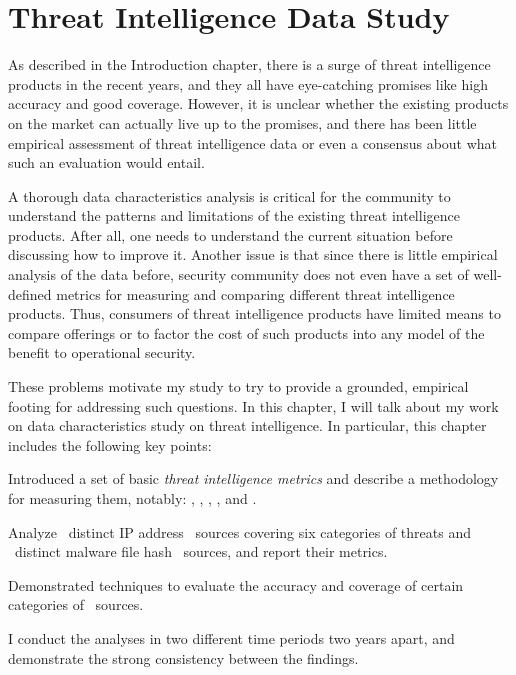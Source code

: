 \chapter{Threat Intelligence Data Study}
\label{chapter:data_character}

As described in the Introduction 
chapter, there is a surge of threat intelligence products in the 
recent years, and they all have eye-catching promises like high 
accuracy and good coverage. However, it is unclear whether the
existing products on the market can actually live up to the 
promises, and there has been little empirical assessment of 
threat intelligence data or even a consensus about what such an
evaluation would entail. 

A thorough data characteristics analysis is critical for the 
community to understand the patterns and limitations of the
existing threat intelligence products. After all, one needs to 
understand the current situation before discussing how to 
improve it. Another issue is that since there is little empirical 
analysis of the data before, security community does not even 
have a set of well-defined metrics for
measuring and comparing different threat intelligence products. 
Thus, consumers of threat intelligence products have limited means 
to compare offerings or to factor the cost of such products into 
any model of the benefit to operational security.

These problems motivate my study to try to provide a grounded,
empirical footing for addressing such questions. 
In this chapter, I will talk about my work on data characteristics
study on threat intelligence. In particular, this chapter includes 
the following key points:
\begin{prettylist}
\item Introduced a set of basic \emph{threat intelligence metrics}
and describe a methodology for measuring them, notably: 
,
, ,
,  and .
\item Analyze \numipfeeds\ distinct IP address \ti\ sources covering
six categories of threats and \numhashfeeds\ distinct malware file hash
\ti\ sources, and report their metrics.
\item Demonstrated techniques to evaluate the accuracy and coverage of
certain categories of \ti\ sources.
\item I conduct the analyses in two different time periods two 
years apart, and demonstrate the strong consistency between the 
findings.
\end{prettylist}

